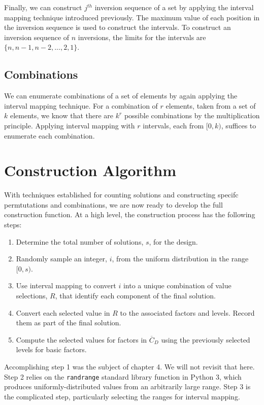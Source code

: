 Finally, we can construct $j^{th}$ inversion sequence of a set by applying the interval mapping technique introduced previously. The maximum value of each position in the inversion sequence is used to construct the intervals. To construct an inversion sequence of $n$ inversions, the limits for the intervals are $\{n, n - 1, n - 2, ..., 2, 1\}$.

\subsection{Combinations}

We can enumerate combinations of a set of elements by again applying the interval mapping technique. For a combination of $r$ elements, taken from a set of $k$ elements, we know that there are $k^r$ possible combinations by the multiplication principle. Applying interval mapping with $r$ intervals, each from $[0, k)$, suffices to enumerate each combination.


\section{Construction Algorithm}

With techniques established for counting solutions and constructing specifc permtutations and combinations, we are now ready to develop the full construction function. At a high level, the construction process has the following steps:

\begin{enumerate}
\item Determine the total number of solutions, $s$, for the design.
\item Randomly sample an integer, $i$, from the uniform distribution in the range $[0, s)$.
\item Use interval mapping to convert $i$ into a unique combination of value selections, $R$, that identify each component of the final solution.
\item Convert each selected value in $R$ to the associated factors and levels. Record them as part of the final solution.
\item Compute the selected values for factors in $\overline{C}_D$ using the previously selected levels for basic factors.
\end{enumerate}

Accomplishing step 1 was the subject of chapter 4. We will not revisit that here. Step 2 relies on the \texttt{randrange} standard library function in Python 3, which produces uniformly-distributed values from an arbitrarily large range. Step 3 is the complicated step, particularly selecting the ranges for interval mapping.


